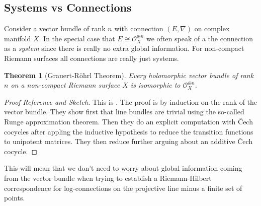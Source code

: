 \documentclass[12pt]{book}
\numberwithin{equation}{section}
\newtheorem{theorem}{Theorem}[subsection]
\theoremstyle{definition}
\theoremstyle{remark}
\newcommand{\Ocal}{\mathcal{O}}
\begin{document}
\subsection{Systems vs Connections}
Consider a vector bundle of rank $n$ with connection $(E,\nabla)$ on complex manifold $X$.
In the special case that $E\cong \Ocal_X^{\oplus n}$ we often speak of a the connection as a \emph{system} since there is really no extra global information. 
For non-compact Riemann surfaces all connections are really just systems.
\begin{theorem}[Grauert-Röhrl Theorem]
	Every holomorphic vector bundle of rank $n$ on a non-compact Riemann surface $X$ is isomorphic to $\Ocal_X^{\oplus n}$.
\end{theorem}
\begin{proof}[Proof Reference and Sketch]
	This is \cite[Theorem 30.4]{Forster1981}.
	The proof is by induction on the rank of the vector bundle. 
	They show first that line bundles are trivial using the so-called Runge approximation theorem.
	Then they do an explicit computation with \v{C}ech cocycles after appling the inductive hypothesis to reduce the transition functions to unipotent matrices. 
	They then reduce further arguing about an additive \v{C}ech cocycle.
\end{proof}

This will mean that we don't need to worry about global information coming from the vector bundle when trying to establish a Riemann-Hilbert correspondence for log-connections on the projective line minus a finite set of points. 

\end{document}
